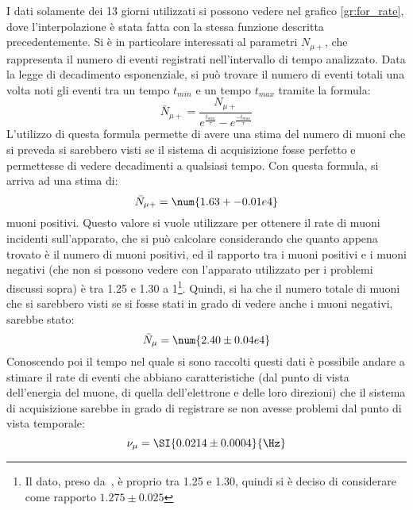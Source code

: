 I dati solamente dei 13 giorni utilizzati si possono vedere nel grafico \ref{gr:for_rate}, dove l'interpolazione è stata fatta con la stessa funzione descritta precedentemente. Si è in particolare interessati al parametri $N_{\mu+}$, che rappresenta il numero di eventi registrati nell'intervallo di tempo analizzato. 
Data la legge di decadimento esponenziale, si può trovare il numero di eventi totali una volta noti gli eventi tra un tempo $t_\textit{min}$ e un tempo $t_\textit{max}$  tramite la formula:
\begin{equation}
  \bar{N}_{\mu+} = \frac{N_{\mu+}}{e^{\frac{t_\textit{min}}{\tau}}-e^{\frac{-t_\textit{max}}{\tau}}}
  \label{eq:tot_mup}
\end{equation}
L'utilizzo di questa formula permette di avere una stima del numero di muoni che si preveda si sarebbero visti se il sistema di acquisizione fosse perfetto e permettesse di vedere decadimenti a qualsiasi tempo. Con questa formula, si arriva ad una stima di:
\begin{equation}
  \bar{N}_{\mu+} = \num{1.63+-0.01e4}
\end{equation}
muoni positivi. 
Questo valore si vuole utilizzare per ottenere il rate di muoni incidenti sull'apparato, che si può calcolare considerando che quanto appena trovato è il numero di muoni positivi, ed il rapporto tra i muoni positivi e i muoni negativi (che non si possono vedere con l'apparato utilizzato per i problemi discussi sopra) è tra 1.25 e 1.30 a 1\footnote{Il dato, preso da~\cite{bib:Patrignani:2016xqp}, è proprio tra  1.25 e 1.30, quindi si è deciso di considerare come rapporto $1.275\pm0.025$}. 
Quindi, si ha che il numero totale di muoni che si sarebbero visti se si fosse stati in grado di vedere anche i muoni negativi, sarebbe stato:
\begin{equation}
  \bar{N}_{\mu} = \num{2.40 \pm 0.04e4}
\end{equation}
Conoscendo poi il tempo nel quale si sono raccolti questi dati è possibile andare a stimare il rate di eventi che abbiano caratteristiche (dal punto di vista dell'energia del muone, di quella dell'elettrone e delle loro direzioni) che il sistema di acquisizione sarebbe in grado di registrare se non avesse problemi dal punto di vista temporale:
\begin{equation}
  \nu_\mu = \SI{0.0214 \pm 0.0004}{\Hz}
\end{equation}
